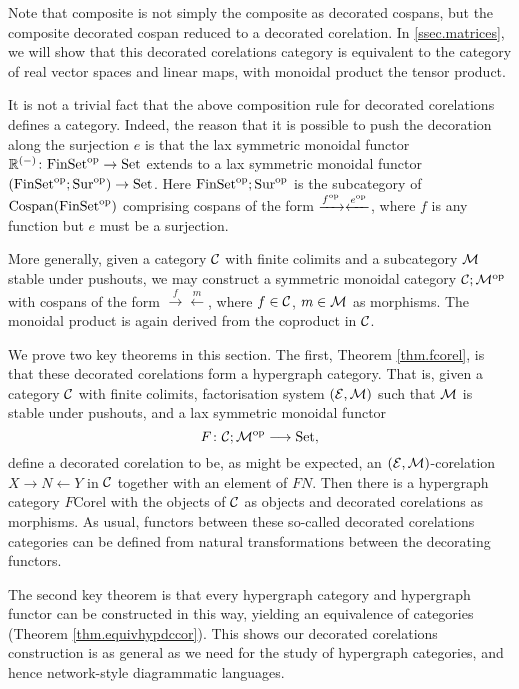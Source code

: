 Note that composite is not simply the composite as decorated cospans, but the
composite decorated cospan reduced to a decorated corelation. In
\textsection\ref{ssec.matrices}, we will show that this decorated corelations
category is equivalent to the category of real vector spaces and linear maps,
with monoidal product the tensor product.

It is not a trivial fact that the above composition rule for decorated
corelations defines a category. Indeed, the reason that it is possible to push
the decoration along the surjection $e$ is that the lax symmetric monoidal
functor ${\mathbb{R}}^{(-)}{\colon} \mathrm{FinSet}^{\mathrm{op}} \to \mathrm{Set}$ extends to a lax symmetric
monoidal functor $(\mathrm{FinSet}^{\mathrm{op}};\mathrm{Sur}^{\mathrm{op}}) \to \mathrm{Set}$. Here
$\mathrm{FinSet}^{\mathrm{op}};\mathrm{Sur}^{\mathrm{op}}$ is the subcategory of $\operatorname{{Cospan}}(\mathrm{FinSet}^{\mathrm{op}})$
comprising cospans of the form $\xrightarrow{f^{\mathrm{op}}}\xleftarrow{e^{\mathrm{op}}}$, where
$f$ is any function but $e$ must be a surjection.

More generally, given a category $\mathcal C$ with finite colimits and a subcategory
$\mathcal M$ stable under pushouts, we may construct a symmetric monoidal category
$\mathcal C;\mathcal M^{\mathrm{op}}$ with cospans of the form $\xrightarrow{f}\xleftarrow{m}$,
where $f \in \mathcal C$, $m \in \mathcal M$ as morphisms. The monoidal product is again
derived from the coproduct in $\mathcal C$.

We prove two key theorems in this section. The first, Theorem \ref{thm.fcorel},
is that these decorated corelations form a hypergraph category. That is, given a
category $\mathcal C$ with finite colimits, factorisation system $(\mathcal E,\mathcal M)$ such
that $\mathcal M$ is stable under pushouts, and a lax symmetric monoidal functor 
\[
  F{\colon} \mathcal C; \mathcal M^{\mathrm{op}} \longrightarrow \mathrm{Set},
\]
define a decorated corelation to be, as might be expected, an $(\mathcal E,\mathcal
M)$-corelation $X \to N \leftarrow Y$ in $\mathcal C$ together with an element of
$FN$. Then there is a hypergraph category $F\mathrm{Corel}$ with the objects of
$\mathcal C$ as objects and decorated corelations as morphisms. As usual, functors
between these so-called decorated corelations categories can be defined from
natural transformations between the decorating functors.

The second key theorem is that every hypergraph category and hypergraph
functor can be constructed in this way, yielding an equivalence of categories
(Theorem \ref{thm.equivhypdccor}). This shows our decorated corelations
construction is as general as we need for the study of hypergraph categories,
and hence network-style diagrammatic languages.


